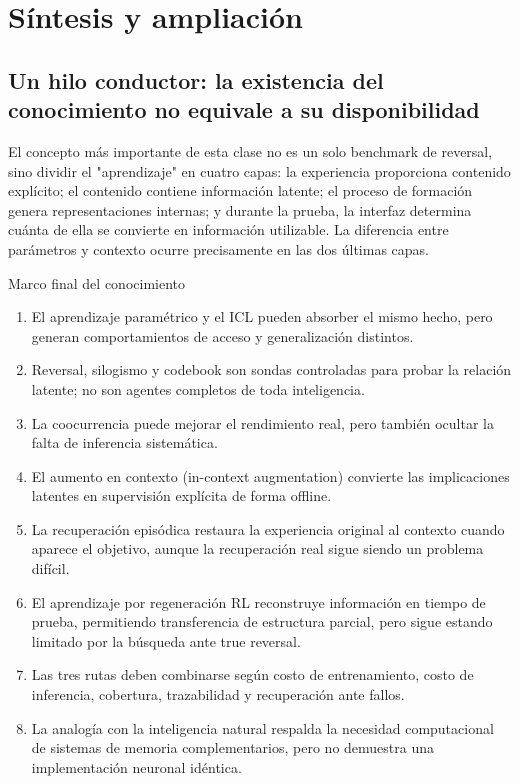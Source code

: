 \section{Síntesis y ampliación}

\subsection{Un hilo conductor: la existencia del conocimiento no equivale a su disponibilidad}

El concepto más importante de esta clase no es un solo benchmark de reversal, sino dividir el "aprendizaje" en cuatro capas: la experiencia proporciona contenido explícito; el contenido contiene información latente; el proceso de formación genera representaciones internas; y durante la prueba, la interfaz determina cuánta de ella se convierte en información utilizable. La diferencia entre parámetros y contexto ocurre precisamente en las dos últimas capas.

\begin{importantbox}{Marco final del conocimiento}
\begin{enumerate}
  \item El aprendizaje paramétrico y el ICL pueden absorber el mismo hecho, pero generan comportamientos de acceso y generalización distintos.
  \item Reversal, silogismo y codebook son sondas controladas para probar la relación latente; no son agentes completos de toda inteligencia.
  \item La coocurrencia puede mejorar el rendimiento real, pero también ocultar la falta de inferencia sistemática.
  \item El aumento en contexto (in-context augmentation) convierte las implicaciones latentes en supervisión explícita de forma offline.
  \item La recuperación episódica restaura la experiencia original al contexto cuando aparece el objetivo, aunque la recuperación real sigue siendo un problema difícil.
  \item El aprendizaje por regeneración RL reconstruye información en tiempo de prueba, permitiendo transferencia de estructura parcial, pero sigue estando limitado por la búsqueda ante true reversal.
  \item Las tres rutas deben combinarse según costo de entrenamiento, costo de inferencia, cobertura, trazabilidad y recuperación ante fallos.
  \item La analogía con la inteligencia natural respalda la necesidad computacional de sistemas de memoria complementarios, pero no demuestra una implementación neuronal idéntica.
\end{enumerate}
\end{importantbox}


